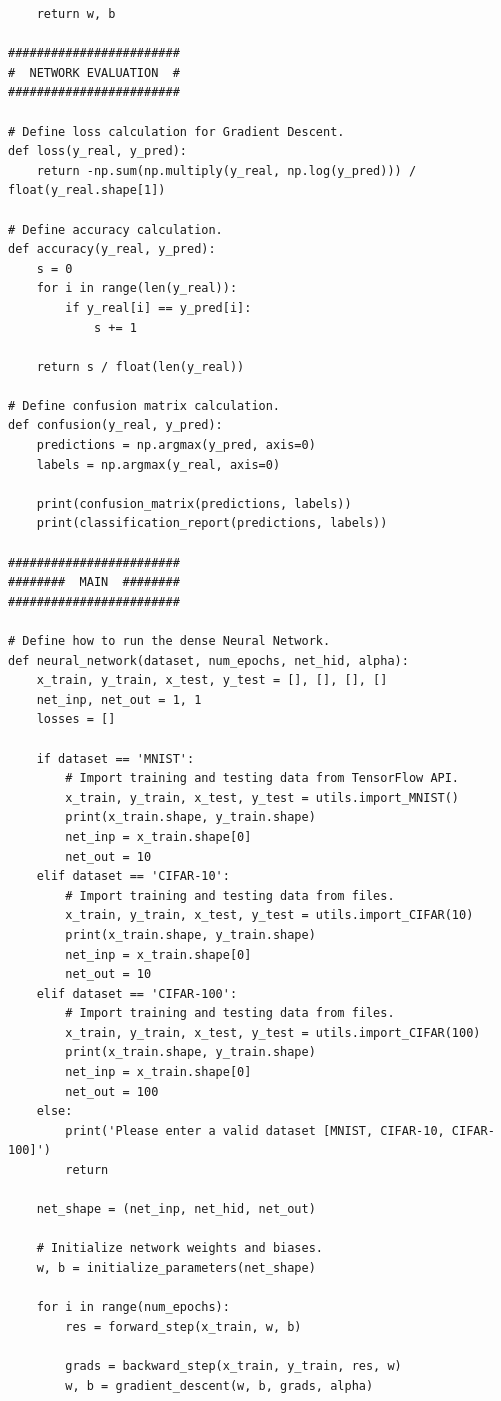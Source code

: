 \documentclass[letterpaper]{article} %
\begin{document}
{\begin{verbatim}
    return w, b

########################
#  NETWORK EVALUATION  #
########################

# Define loss calculation for Gradient Descent.
def loss(y_real, y_pred):
    return -np.sum(np.multiply(y_real, np.log(y_pred))) / float(y_real.shape[1])

# Define accuracy calculation.
def accuracy(y_real, y_pred):
    s = 0
    for i in range(len(y_real)):
        if y_real[i] == y_pred[i]:
            s += 1

    return s / float(len(y_real))

# Define confusion matrix calculation.
def confusion(y_real, y_pred):
    predictions = np.argmax(y_pred, axis=0)
    labels = np.argmax(y_real, axis=0)

    print(confusion_matrix(predictions, labels))
    print(classification_report(predictions, labels))

########################
########  MAIN  ########
########################

# Define how to run the dense Neural Network.
def neural_network(dataset, num_epochs, net_hid, alpha):
    x_train, y_train, x_test, y_test = [], [], [], []
    net_inp, net_out = 1, 1
    losses = []

    if dataset == 'MNIST':
        # Import training and testing data from TensorFlow API.
        x_train, y_train, x_test, y_test = utils.import_MNIST()
        print(x_train.shape, y_train.shape)
        net_inp = x_train.shape[0]
        net_out = 10
    elif dataset == 'CIFAR-10':
        # Import training and testing data from files.
        x_train, y_train, x_test, y_test = utils.import_CIFAR(10)
        print(x_train.shape, y_train.shape)
        net_inp = x_train.shape[0]
        net_out = 10
    elif dataset == 'CIFAR-100':
        # Import training and testing data from files.
        x_train, y_train, x_test, y_test = utils.import_CIFAR(100)
        print(x_train.shape, y_train.shape)
        net_inp = x_train.shape[0]
        net_out = 100
    else:
        print('Please enter a valid dataset [MNIST, CIFAR-10, CIFAR-100]')
        return

    net_shape = (net_inp, net_hid, net_out)

    # Initialize network weights and biases.
    w, b = initialize_parameters(net_shape)

    for i in range(num_epochs):
        res = forward_step(x_train, w, b)

        grads = backward_step(x_train, y_train, res, w)
        w, b = gradient_descent(w, b, grads, alpha)


\end{verbatim}}
\end{document}
